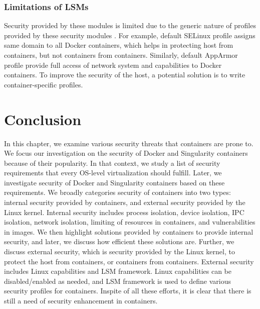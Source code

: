 \subsubsection{Limitations of LSMs}

Security provided by these modules is limited due to
the generic nature of profiles provided by these security
modules \cite{martin2018docker}. For example, default
SELinux profile assigns same domain to all Docker
containers, which helps in protecting host from containers,
but not containers from containers. Similarly, default
AppArmor profile provide full access of network system and
capabilities to Docker containers.
To improve the security of the host, a potential solution is to write
container-specific profiles.

\section{Conclusion}

In this chapter, we examine various security threats that
containers are prone to. We focus our investigation on the
security of Docker and Singularity containers because of their popularity.
In that context, we study a list of security requirements that every OS-level
virtualization should fulfill. Later, we investigate security of Docker and Singularity
containers based on these requirements. We broadly categories security of
containers into two types: internal security provided by containers, and
external security provided by the Linux kernel.
Internal security includes process isolation, device isolation, IPC
isolation, network isolation, limiting of resources in containers, and
vulnerabilities in images.
We then highlight solutions
provided by containers to provide internal security, and later,
we discuss how efficient these solutions are.
Further, we discuss external security, which is security provided by
the Linux kernel, to protect the host from containers, or containers from
containers. External security includes Linux
capabilities and LSM framework. Linux capabilities can be
disabled/enabled as needed, and LSM framework is used
to define various security profiles for containers.
Inspite of all these efforts, it is clear that there is
still a need of security enhancement in containers.
